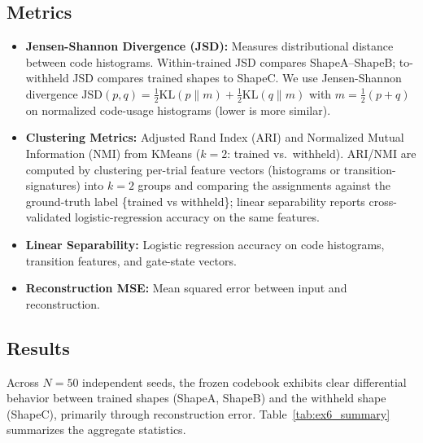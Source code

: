 \documentclass{article}
\begin{document}
\subsection{Metrics}
\begin{itemize}
    \item \textbf{Jensen-Shannon Divergence (JSD):} Measures distributional distance between code histograms. Within-trained JSD compares ShapeA--ShapeB; to-withheld JSD compares trained shapes to ShapeC. We use Jensen-Shannon divergence $\mathrm{JSD}(p,q)=\tfrac12\mathrm{KL}(p\|m)+\tfrac12\mathrm{KL}(q\|m)$ with $m=\tfrac12(p+q)$ on normalized code-usage histograms (lower is more similar).

    \item \textbf{Clustering Metrics:} Adjusted Rand Index (ARI) and Normalized Mutual Information (NMI) from KMeans ($k=2$: trained vs.\ withheld). ARI/NMI are computed by clustering per-trial feature vectors (histograms or transition-signatures) into $k{=}2$ groups and comparing the assignments against the ground-truth label \{trained vs withheld\}; linear separability reports cross-validated logistic-regression accuracy on the same features.

    \item \textbf{Linear Separability:} Logistic regression accuracy on code histograms, transition features, and gate-state vectors.
    \item \textbf{Reconstruction MSE:} Mean squared error between input and reconstruction.
\end{itemize}

\subsection{Results}

Across $N=50$ independent seeds, the frozen codebook exhibits clear differential behavior between trained shapes (ShapeA, ShapeB) and the withheld shape (ShapeC), primarily through reconstruction error.
Table~\ref{tab:ex6_summary} summarizes the aggregate statistics.


\end{document}
